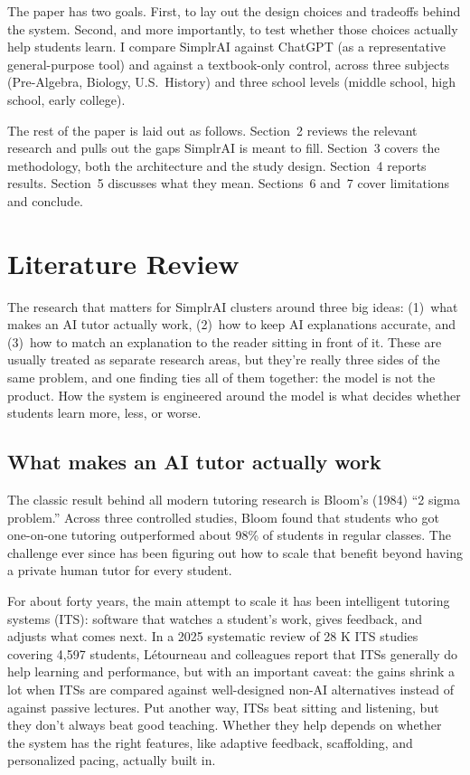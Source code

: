 \documentclass[11pt,letterpaper]{article}
\begin{document}
The paper has two goals. First, to lay out the design choices and tradeoffs
behind the system. Second, and more importantly, to test whether those choices
actually help students learn. I compare SimplrAI against ChatGPT (as a
representative general-purpose tool) and against a textbook-only control,
across three subjects (Pre-Algebra, Biology, U.S.\ History) and three school
levels (middle school, high school, early college).

The rest of the paper is laid out as follows. Section~2 reviews the relevant
research and pulls out the gaps SimplrAI is meant to fill. Section~3 covers
the methodology, both the architecture and the study design. Section~4
reports results. Section~5 discusses what they mean. Sections~6 and~7 cover
limitations and conclude.

\section{Literature Review}

The research that matters for SimplrAI clusters around three big ideas:
(1)~what makes an AI tutor actually work, (2)~how to keep AI explanations
accurate, and (3)~how to match an explanation to the reader sitting in front
of it. These are usually treated as separate research areas, but they're
really three sides of the same problem, and one finding ties all of them
together: the model is not the product. How the system is engineered around
the model is what decides whether students learn more, less, or worse.

\subsection{What makes an AI tutor actually work}

The classic result behind all modern tutoring research is Bloom's (1984)
``2 sigma problem.'' Across three controlled studies, Bloom found that
students who got one-on-one tutoring outperformed about 98\% of students in
regular classes. The challenge ever since has been figuring out how to scale
that benefit beyond having a private human tutor for every student.

For about forty years, the main attempt to scale it has been intelligent
tutoring systems (ITS): software that watches a student's work, gives
feedback, and adjusts what comes next. In a 2025 systematic review of 28
K ITS studies covering 4,597 students, L\'etourneau and
colleagues report that ITSs generally do help learning and performance, but
with an important caveat: the gains shrink a lot when ITSs are compared
against well-designed non-AI alternatives instead of against passive lectures.
Put another way, ITSs beat sitting and listening, but they don't always beat
good teaching. Whether they help depends on whether the system has the right
features, like adaptive feedback, scaffolding, and personalized pacing, actually
built in.
\end{document}
